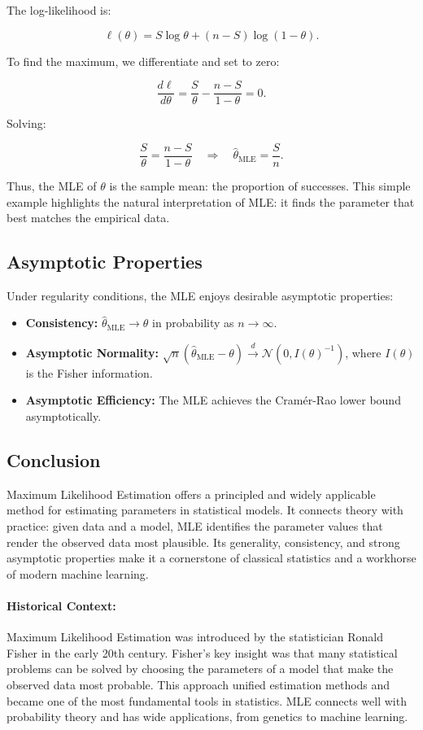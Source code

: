 \documentclass{book}
\begin{document}
The log-likelihood is:

\[
\ell(\theta) = S \log \theta + (n - S) \log(1 - \theta).
\]

To find the maximum, we differentiate and set to zero:

\[
\frac{d\ell}{d\theta} = \frac{S}{\theta} - \frac{n - S}{1 - \theta} = 0.
\]

Solving:

\[
\frac{S}{\theta} = \frac{n - S}{1 - \theta} \quad \Rightarrow \quad \hat{\theta}_{\text{MLE}} = \frac{S}{n}.
\]

Thus, the MLE of \( \theta \) is the sample mean: the proportion of successes. This simple example highlights the natural interpretation of MLE: it finds the parameter that best matches the empirical data.

\subsection*{Asymptotic Properties}

Under regularity conditions, the MLE enjoys desirable asymptotic properties:

\begin{itemize}
  \item \textbf{Consistency:} \( \hat{\theta}_{\text{MLE}} \to \theta \) in probability as \( n \to \infty \).
  \item \textbf{Asymptotic Normality:} \( \sqrt{n}(\hat{\theta}_{\text{MLE}} - \theta) \overset{d}{\to} \mathcal{N}(0, I(\theta)^{-1}) \), where \( I(\theta) \) is the Fisher information.
  \item \textbf{Asymptotic Efficiency:} The MLE achieves the Cramér-Rao lower bound asymptotically.
\end{itemize}

\subsection*{Conclusion}

Maximum Likelihood Estimation offers a principled and widely applicable method for estimating parameters in statistical models. It connects theory with practice: given data and a model, MLE identifies the parameter values that render the observed data most plausible. Its generality, consistency, and strong asymptotic properties make it a cornerstone of classical statistics and a workhorse of modern machine learning.

\newpage

\paragraph{Historical Context:}
Maximum Likelihood Estimation was introduced by the statistician Ronald Fisher in the early 20th century. Fisher’s key insight was that many statistical problems can be solved by choosing the parameters of a model that make the observed data most probable. This approach unified estimation methods and became one of the most fundamental tools in statistics. MLE connects well with probability theory and has wide applications, from genetics to machine learning.
\end{document}
